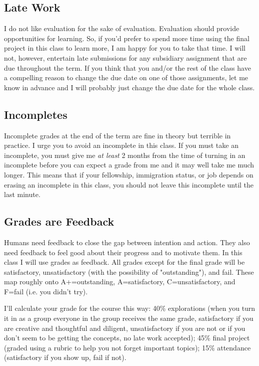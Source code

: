 \documentclass[11pt,letterpaper]{article}
\begin{document}
    \subsection*{Late Work}
    I do not like evaluation for the sake of evaluation. Evaluation should
    provide opportunities for learning. So, if you'd prefer to spend
    more time using the final project in this class to learn more, I am
    happy for you to take that time. I will not, however, entertain late
    submissions for any subsidiary assignment that are due
    throughout the term. If you think that you and/or the rest of the
    class have a compelling reason to change the due date on one of those
    assignments, let me know in advance and I will probably just change
    the due date for the whole class.

    \subsection*{Incompletes} Incomplete grades at the end of the term are fine
    in theory but terrible in practice. I urge you to avoid an incomplete in
    this class. If you must take an incomplete, you must give me \emph{at
    least} 2 months from the time of turning in an incomplete before you can
    expect a grade from me and it may well take me much longer. This means that
    if your fellowship, immigration status, or job depends on erasing an
    incomplete in this class, you should not leave this incomplete until the
    last minute.

    \subsection*{Grades are Feedback}

    Humans need feedback to close the gap between  intention and action. They
    also need feedback to feel good about their progress and to motivate them.
    In this class I will use grades as feedback. All grades except for the
    final grade will be satisfactory, unsatisfactory (with the possibility of
    "outstanding"), and fail. These map roughly onto  A+=outstanding,
    A=satisfactory, C=unsatisfactory, and F=fail (i.e. you didn't try).

    I'll calculate your grade for the course this way: 40\% explorations (when
    you turn it in as a group everyone in the group receives the same grade,
    satisfactory if you are creative and thoughtful and diligent,
    unsatisfactory if you are not or if you don't seem to be getting the
    concepts, no late work accepted); 45\% final project (graded using a rubric
    to help you not forget important topics); 15\% attendance (satisfactory if you show up, fail if not).
\end{document}
